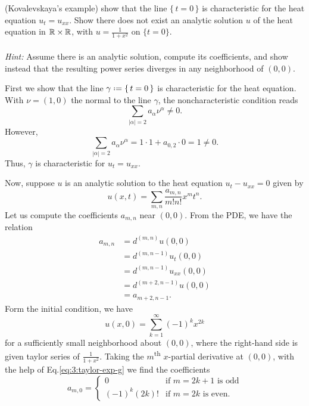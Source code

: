 \begin{problem}
  (Kovalevskaya's example) show that the line \(\{\,t=0\,\}\) is
  characteristic for the heat equation \(u_t=u_{xx}\). Show there does not
  exist an analytic solution \(u\) of the heat equation in \(\mathbb{R}\times\mathbb{R}\),
  with \(u=\frac{1}{1+x^2}\) on \(\{t=0\}\).
  \\\\
  \emph{Hint:} Assume there is an analytic solution, compute its
  coefficients, and show instead that the resulting power series diverges
  in any neighborhood of \((0,0)\).
\end{problem}
\begin{solution*}
    First we show that the line \(\gamma\defeq\{\,t=0\,\}\) is characteristic
  for the heat equation. With \(\nu=(1,0)\) the normal to the line
  \(\gamma\), the noncharacteristic condition reads
  \[
    \sum_{|\alpha|=2} a_\alpha\nu^\alpha\neq 0.
  \]
  However,
  \[
    \sum_{|\alpha|=2} a_\alpha\nu^\alpha=%
    1\cdot 1+a_{0,2}\cdot 0=%
    1\neq%
    0.
  \]
  Thus, \(\gamma\) is characteristic for \(u_t=u_{xx}\).

  Now, suppose \(u\) is an analytic solution to the heat equation
  \(u_t-u_{xx}=0\) given by
  \[
    u(x,t)=\sum_{m,n} \frac{a_{m,n}}{m!n!}x^mt^n.
  \]
  Let us compute the coefficients \(a_{m,n}\) near \((0,0)\). From the PDE,
  we have the relation
  \begin{equation}
    \label{eq:3:pde-relation}
    \begin{aligned}
      a_{m,n}
      &=d^{(m,n)} u(0,0)\\
      &=d^{(m,n-1)}u_t(0,0)\\
      &=d^{(m,n-1)}u_{xx}(0,0)\\
      &=d^{(m+2,n-1)}u(0,0)\\
      &=a_{m+2,n-1}.
    \end{aligned}
  \end{equation}
  Form the initial condition, we have
  \begin{equation}
    \label{eq:3:taylor-exp-g}
    u(x,0)=\sum_{k=1}^\infty (-1)^k x^{2k}
  \end{equation}
  for a sufficiently small neighborhood about \((0,0)\), where the
  right-hand side is given taylor series of \(\frac{1}{1+x^2}\). Taking the
  \(m\)\textsuperscript{th} \(x\)-partial derivative at \((0,0)\), with the
  help of Eq.\@ \eqref{eq:3:taylor-exp-g} we find the coefficients
  \begin{equation}
    \label{eq:3:boundary-relation}
    a_{m,0}=
    \begin{cases}
      0&\text{if \(m=2k+1\) is odd}\\
      (-1)^k(2k)!&\text{if \(m=2k\) is even.}
    \end{cases}
  \end{equation}


\end{solution*}
